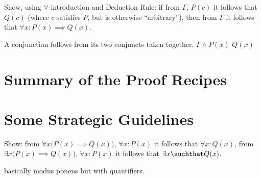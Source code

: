 \documentclass{report}
\begin{document}
\begin{Exercise}[number=18]
  Show, using $\forall$-introduction and Deduction Rule: if from $\Gamma$, $P(c)$ it follows that $Q(c)$ (where $c$ satisfies $P$, but is otherwise ``arbitrary''), then from $\Gamma$ it follows that $\forall{x} \colon P(x) \implies Q(x)$.
\end{Exercise}

\begin{Answer} [number=18]
  \begin{structured_derivation}
    \begin{nested_derivation}
      \assumption{$\Gamma$}
      \begin{nested_derivation}
        \observation
          {A conjunction follows from its two conjuncts taken together.}
          { $\Gamma \land P(x)$ }
        \observation
          {}
          { $Q(x)$ }
      \end{nested_derivation}
    \end{nested_derivation}
  \end{structured_derivation}
\end{Answer}
\section{Summary of the Proof Recipes}
\section{Some Strategic Guidelines}

\begin{Exercise} [number=25]
    Show:
    \Question from $\forall{x}\bigl(P(x) \implies Q(x)\bigr)$, $\forall{x} \colon P(x)$ it follows that $\forall{x} \colon Q(x)$,
    \Question from $\exists{x}\bigl(P(x) \implies Q(x)\bigr)$, $\forall{x} \colon P(x)$ it follows that $\exists{x} \suchthat Q(x)$.
\end{Exercise}

\begin{Answer} [number=25.1]
    \begin{structured_derivation}
        \begin{nested_derivation}
            basically modus ponens but with quantifiers. 
        \end{nested_derivation}
    \end{structured_derivation}
\end{Answer}
\end{document}
